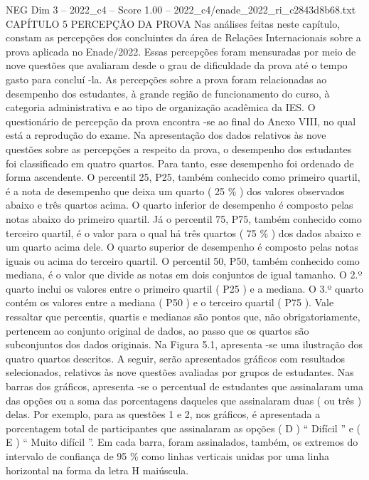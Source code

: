 \begin{textsample}{NEG Dim 3 – 2022\_c4 – Score 1.00 – 2022\_c4/enade\_2022\_ri\_c2843d8b68.txt}  \label{ex:f3_neg_150}
CAPÍTULO 5 PERCEPÇÃO DA PROVA Nas análises feitas neste capítulo, constam as percepções dos concluintes da área de Relações Internacionais sobre a prova aplicada no Enade/2022.
Essas percepções foram mensuradas por meio de nove questões que avaliaram desde o grau de dificuldade da prova até o tempo gasto para concluí -la.
As percepções sobre a prova foram relacionadas ao desempenho dos estudantes, à grande região de funcionamento do curso, à categoria administrativa e ao tipo de organização acadêmica da IES.
O questionário de percepção da prova encontra -se ao final do Anexo VIII, no qual está a reprodução do exame.
Na apresentação dos dados relativos às nove questões sobre as percepções a respeito da prova, o desempenho dos estudantes foi classificado em quatro quartos.
Para tanto, esse desempenho foi ordenado de forma ascendente.
O percentil 25, P25, também conhecido como primeiro quartil, é a nota de desempenho que deixa um quarto ( 25 \% ) dos valores observados abaixo e três quartos acima.
O quarto inferior de desempenho é composto pelas notas abaixo do primeiro quartil.
Já o percentil 75, P75, também conhecido como terceiro quartil, é o valor para o qual há três quartos ( 75 \% ) dos dados abaixo e um quarto acima dele.
O quarto superior de desempenho é composto pelas notas iguais ou acima do terceiro quartil.
O percentil 50, P50, também conhecido como mediana, é o valor que divide as notas em dois conjuntos de igual tamanho.
O 2.º quarto inclui os valores entre o primeiro quartil ( P25 ) e a mediana.
O 3.º quarto contém os valores entre a mediana ( P50 ) e o terceiro quartil ( P75 ).
Vale ressaltar que percentis, quartis e medianas são pontos que, não obrigatoriamente, pertencem ao conjunto original de dados, ao passo que os quartos são subconjuntos dos dados originais.
Na Figura 5.1, apresenta -se uma ilustração dos quatro quartos descritos.
A seguir, serão apresentados gráficos com resultados selecionados, relativos às nove questões avaliadas por grupos de estudantes.
Nas barras dos gráficos, apresenta -se o percentual de estudantes que assinalaram uma das opções ou a soma das porcentagens daqueles que assinalaram duas ( ou três ) delas.
Por exemplo, para as questões 1 e 2, nos gráficos, é apresentada a porcentagem total de participantes que assinalaram as opções ( D ) “ Difícil ” e ( E ) “ Muito difícil ”.
Em cada barra, foram assinalados, também, os extremos do intervalo de confiança de 95 \% como linhas verticais unidas por uma linha horizontal na forma da letra H maiúscula.

\end{textsample}
